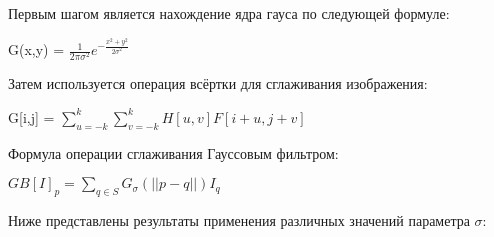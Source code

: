 Первым шагом является нахождение ядра гауса по следующей формуле:

G(x,y) = $\frac{1}{2 \pi \sigma^2} e^{-\frac{x^2+y^2}{2\sigma^2}}$

Затем используется операция всёртки для сглаживания изображения:

G[i,j] = $\sum\limits_{u=-k}^k \sum\limits_{v=-k}^k H[u,v]F[i+u,j+v]$

Формула операции сглаживания Гауссовым фильтром:

$GB[I]_p = \sum\limits_{q \in S} G_\sigma (||p-q||)I_q$

Ниже представлены результаты применения различных значений параметра $\sigma$:
\begin{figure}[H]
	\begin{minipage}[h]{0.49\linewidth}
	\end{minipage}
	\hfill
	\begin{minipage}[h]{0.49\linewidth}
	\end{minipage}
	\vfill
	\begin{minipage}[h]{0.49\linewidth}
	\end{minipage}
	\hfill
	\begin{minipage}[h]{0.49\linewidth}
	\end{minipage}
	\vfill
	\begin{minipage}[h]{0.49\linewidth}
	\end{minipage}
	\hfill
	\begin{minipage}[h]{0.49\linewidth}
	\end{minipage}	
	\vfill
	\begin{minipage}[h]{0.49\linewidth}
	\end{minipage}
	\hfill
	\begin{minipage}[h]{0.49\linewidth}
	\end{minipage}	
\end{figure}

